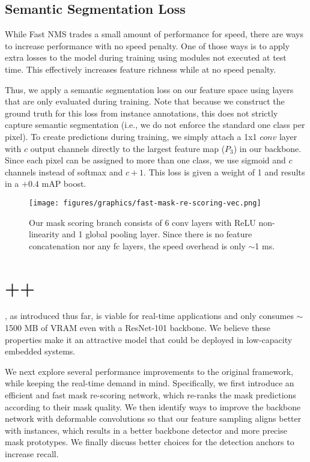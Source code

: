 \documentclass[10pt,journal,compsoc]{IEEEtran}
\begin{document}
\subsection{Semantic Segmentation Loss}
While Fast NMS trades a small amount of performance for speed, there are ways to increase performance with no speed penalty. One of those ways is to apply extra losses to the model during training using modules not executed at test time. This effectively increases feature richness while at no speed penalty.

Thus, we apply a semantic segmentation loss on our feature space using layers that are only evaluated during training. Note that because we construct the ground truth for this loss from instance annotations, this does not strictly capture semantic segmentation (i.e., we do not enforce the standard one class per pixel).
To create predictions during training, we simply attach a 1x1 $\textit{conv}$ layer with $c$ output channels directly to the largest feature map ($P_3$) in our backbone. Since each pixel can be assigned to more than one class, we use sigmoid and $c$ channels instead of softmax and $c+1$. This loss is given a weight of 1 and results in a $+0.4$ mAP boost.

\begin{figure}
    \centering
    
\texttt{[image: figures/graphics/fast-mask-re-scoring-vec.png]}


    \caption{ Our mask scoring branch consists of 6 conv layers with ReLU non-linearity and 1 global pooling layer.  Since there is no feature concatenation nor any fc layers, the speed overhead is only $\sim$1 ms.}
\label{fig:mask_score}
\end{figure} \section{\methodname++}\label{sec:yolact++}
\methodname{}, as introduced thus far, is viable for real-time applications and only consumes $\sim$1500 MB of VRAM even with a ResNet-101 backbone.  We believe these properties make it an attractive model that could be deployed in low-capacity embedded systems. 

We next explore several performance improvements to the original framework, while keeping the real-time demand in mind.  Specifically, we first introduce an efficient and fast mask re-scoring network, which re-ranks the mask predictions according to their mask quality.  We then identify ways to improve the backbone network with deformable convolutions so that our feature sampling aligns better with instances, which results in a better backbone detector and more precise mask prototypes. We finally discuss better choices for the detection anchors to increase recall.
\end{document}
